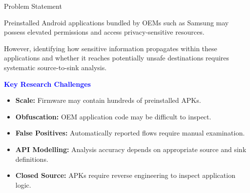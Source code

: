 \documentclass[aspectratio=169,10pt]{beamer}
\newcommand{\hd}[1]{\textbf{\textcolor{blue}{#1}}}
\begin{document}
\begin{frame}{Problem Statement}

Preinstalled Android applications bundled by OEMs such as Samsung may possess elevated permissions and access privacy-sensitive resources.

However, identifying how sensitive information propagates within these applications and whether it reaches potentially unsafe destinations requires systematic source-to-sink analysis.

\vspace{8pt}

\hd{Key Research Challenges}

\begin{itemize}

    \item \textbf{Scale:}
    Firmware may contain hundreds of preinstalled APKs.

    \item \textbf{Obfuscation:}
    OEM application code may be difficult to inspect.

    \item \textbf{False Positives:}
    Automatically reported flows require manual examination.

    \item \textbf{API Modelling:}
    Analysis accuracy depends on appropriate source and sink definitions.

    \item \textbf{Closed Source:}
    APKs require reverse engineering to inspect application logic.

\end{itemize}

\end{frame}

\end{document}
